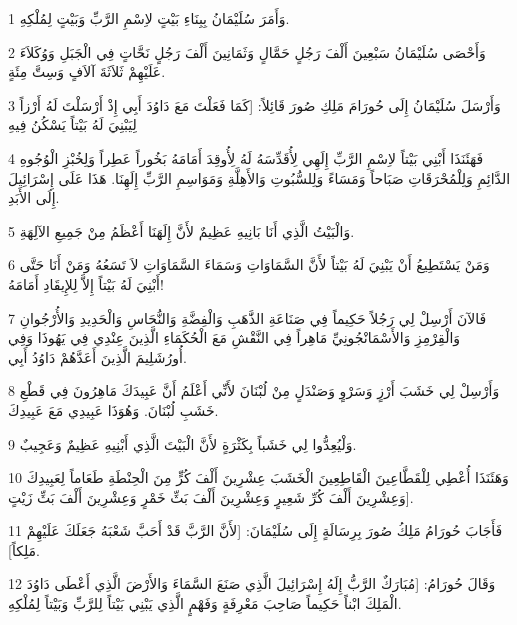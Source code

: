 \par 1 وَأَمَرَ سُلَيْمَانُ بِبِنَاءِ بَيْتٍ لاِسْمِ الرَّبِّ وَبَيْتٍ لِمُلْكِهِ.
\par 2 وَأَحْصَى سُلَيْمَانُ سَبْعِينَ أَلْفَ رَجُلٍ حَمَّالٍ وَثَمَانِينَ أَلْفَ رَجُلٍ نَحَّاتٍ فِي الْجَبَلِ وَوُكَلاَءَ عَلَيْهِمْ ثَلاَثَةَ آلاَفٍ وَسِتَّ مِئَةٍ.
\par 3 وَأَرْسَلَ سُلَيْمَانُ إِلَى حُورَامَ مَلِكِ صُورَ قَائِلاً: [كَمَا فَعَلْتَ مَعَ دَاوُدَ أَبِي إِذْ أَرْسَلْتَ لَهُ أَرْزاً لِيَبْنِيَ لَهُ بَيْتاً يَسْكُنُ فِيهِ
\par 4 فَهَئَنَذَا أَبْنِي بَيْتاً لاِسْمِ الرَّبِّ إِلَهِي لِأُقَدِّسَهُ لَهُ لِأُوقِدَ أَمَامَهُ بَخُوراً عَطِراً وَلِخُبْزِ الْوُجُوهِ الدَّائِمِ وَلِلْمُحْرَقَاتِ صَبَاحاً وَمَسَاءً وَلِلسُّبُوتِ وَالأَهِلَّةِ وَمَوَاسِمِ الرَّبِّ إِلَهِنَا. هَذَا عَلَى إِسْرَائِيلَ إِلَى الأَبَدِ.
\par 5 وَالْبَيْتُ الَّذِي أَنَا بَانِيهِ عَظِيمٌ لأَنَّ إِلَهَنَا أَعْظَمُ مِنْ جَمِيعِ الآلِهَةِ.
\par 6 وَمَنْ يَسْتَطِيعُ أَنْ يَبْنِيَ لَهُ بَيْتاً لأَنَّ السَّمَاوَاتِ وَسَمَاءَ السَّمَاوَاتِ لاَ تَسَعُهُ وَمَنْ أَنَا حَتَّى أَبْنِيَ لَهُ بَيْتاً إِلاَّ لِلإِيقَادِ أَمَامَهُ!
\par 7 فَالآنَ أَرْسِلْ لِي رَجُلاً حَكِيماً فِي صَنَاعَةِ الذَّهَبِ وَالْفِضَّةِ وَالنُّحَاسِ وَالْحَدِيدِ وَالأُرْجُوانِ وَالْقِرْمِزِ وَالأَسْمَانْجُونِيِّ مَاهِراً فِي النَّقْشِ مَعَ الْحُكَمَاءِ الَّذِينَ عِنْدِي فِي يَهُوذَا وَفِي أُورُشَلِيمَ الَّذِينَ أَعَدَّهُمْ دَاوُدُ أَبِي.
\par 8 وَأَرْسِلْ لِي خَشَبَ أَرْزٍ وَسَرْوٍ وَصَنْدَلٍ مِنْ لُبْنَانَ لأَنِّي أَعْلَمُ أَنَّ عَبِيدَكَ مَاهِرُونَ فِي قَطْعِ خَشَبِ لُبْنَانَ. وَهُوَذَا عَبِيدِي مَعَ عَبِيدِكَ.
\par 9 وَلْيُعِدُّوا لِي خَشَباً بِكَثْرَةٍ لأَنَّ الْبَيْتَ الَّذِي أَبْنِيهِ عَظِيمٌ وَعَجِيبٌ.
\par 10 وَهَئَنَذَا أُعْطِي لِلْقَطَّاعِينَ الْقَاطِعِينَ الْخَشَبَ عِشْرِينَ أَلْفَ كُرٍّ مِنَ الْحِنْطَةِ طَعَاماً لِعَبِيدِكَ وَعِشْرِينَ أَلْفَ كُرِّ شَعِيرٍ وَعِشْرِينَ أَلْفَ بَثِّ خَمْرٍ وَعِشْرِينَ أَلْفَ بَثِّ زَيْتٍ].
\par 11 فَأَجَابَ حُورَامُ مَلِكُ صُورَ بِرِسَالَةٍ إِلَى سُلَيْمَانَ: [لأَنَّ الرَّبَّ قَدْ أَحَبَّ شَعْبَهُ جَعَلَكَ عَلَيْهِمْ مَلِكاً].
\par 12 وَقَالَ حُورَامُ: [مُبَارَكٌ الرَّبُّ إِلَهُ إِسْرَائِيلَ الَّذِي صَنَعَ السَّمَاءَ وَالأَرْضَ الَّذِي أَعْطَى دَاوُدَ الْمَلِكَ ابْناً حَكِيماً صَاحِبَ مَعْرِفَةٍ وَفَهْمٍ الَّذِي يَبْنِي بَيْتاً لِلرَّبِّ وَبَيْتاً لِمُلْكِهِ.
